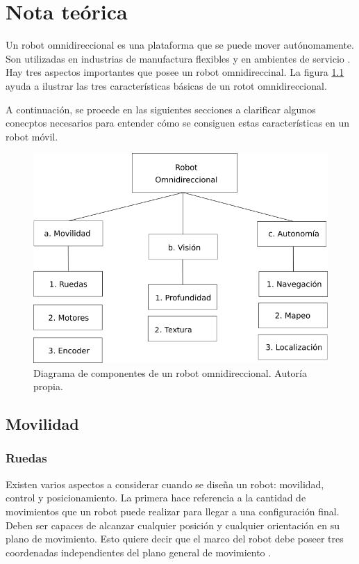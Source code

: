 \chapter{Nota teórica}
\label{C:nota_teorica}

Un robot omnidireccional es una plataforma que se puede mover autónomamente. Son utilizadas en industrias de manufactura flexibles y en ambientes de servicio \cite{Batlle2009}. Hay tres aspectos importantes que posee un robot omnidireccinal. La figura \ref{F:omni} ayuda a ilustrar las tres características básicas de un rotot omnidireccional.

A continuación, se procede en las siguientes secciones a clarificar algunos conecptos necesarios para entender cómo se consiguen estas características en un robot móvil.

\begin{figure}[H]
    \centering
    \includegraphics[scale=0.6]{imagenes/robot_omnidireccional.png}
    \caption{Diagrama de componentes de un robot omnidireccional. Autoría propia.}
    \label{F:omni}
\end{figure}


\section{Movilidad}
\subsection{Ruedas}
Existen varios aspectos a considerar cuando se diseña un robot: movilidad, control y posicionamiento. La primera hace referencia a la cantidad de movimientos que un robot puede realizar para llegar a una configuración final. Deben ser capaces de alcanzar cualquier posición y cualquier orientación en su plano de movimiento. Esto quiere decir que el marco del robot debe poseer tres coordenadas independientes del plano general de movimiento \cite{Batlle2009}.

